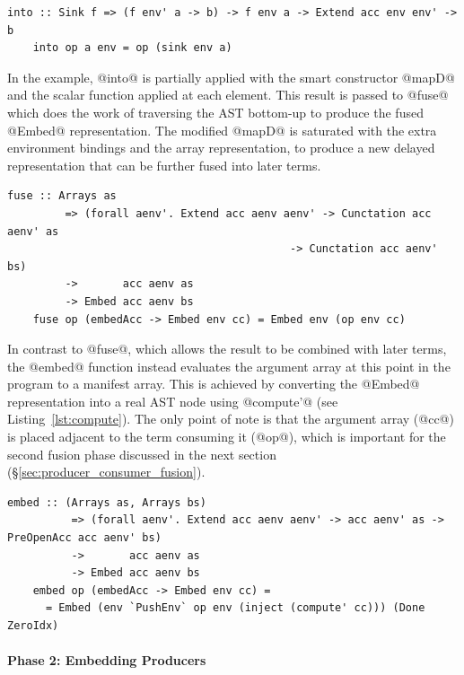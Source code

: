 \begin{lstlisting}[style=haskell,name=embedPreAcc]
    into :: Sink f => (f env' a -> b) -> f env a -> Extend acc env env' -> b
    into op a env = op (sink env a)
\end{lstlisting}

In the example, @into@ is partially applied with the smart constructor
@mapD@ and the scalar function applied at each element. This result is
passed to @fuse@ which does the work of traversing the AST bottom-up to produce the fused @Embed@ representation. The
modified @mapD@ is saturated with the extra environment bindings and the
array representation, to produce a new delayed representation that can be
further fused into later terms.

\begin{lstlisting}[style=haskell,name=embedPreAcc]
    fuse :: Arrays as
         => (forall aenv'. Extend acc aenv aenv' -> Cunctation acc aenv' as
                                            -> Cunctation acc aenv' bs)
         ->       acc aenv as
         -> Embed acc aenv bs
    fuse op (embedAcc -> Embed env cc) = Embed env (op env cc)
\end{lstlisting}

In contrast to @fuse@, which allows the result to be combined with later
terms, the @embed@ function instead evaluates the argument array at this
point in the program to a manifest array. This is achieved by converting the
@Embed@ representation into a real AST node
using @compute'@ (see Listing~\ref{lst:compute}). The only point of note is
that the argument array (@cc@) is placed adjacent to the term consuming it
(@op@), which is important for the second fusion phase discussed in the
next section (\S\ref{sec:producer_consumer_fusion}).

\begin{lstlisting}[style=haskell
    ,name=embedPreAcc
    ,caption={Producer fusion via bottom-up contraction of the AST}]
    embed :: (Arrays as, Arrays bs)
          => (forall aenv'. Extend acc aenv aenv' -> acc aenv' as -> PreOpenAcc acc aenv' bs)
          ->       acc aenv as
          -> Embed acc aenv bs
    embed op (embedAcc -> Embed env cc) =
      = Embed (env `PushEnv` op env (inject (compute' cc))) (Done ZeroIdx)
\end{lstlisting}

\paragraph{Phase 2: Embedding Producers}
\label{sec:embedding_producers}

